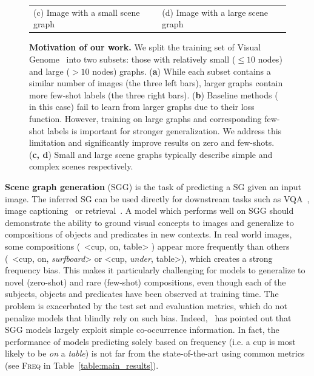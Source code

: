\begin{figure}
{\begin{minipage}{0.4\linewidth}
\begin{tabular}{p{3cm}p{3cm}}
				\centering (c) Image with a small scene graph & \centering (d) Image with a large scene graph
			\end{tabular}
		\end{minipage}
	}
	\vspace{-3pt}
	\caption{\small \textbf{Motivation of our work.} We split the training set of Visual Genome~\citep{Krishna_2017} into two subsets: those with relatively small ($\leq 10$ nodes) and large ($>10$ nodes) graphs. (\textbf{a}) While each subset contains a similar number of images (the three left bars), larger graphs contain more few-shot labels (the three right bars). (\textbf{b}) Baseline methods (\citep{xu2017scene} in this case) fail to learn from larger graphs due to their loss function. However, training on large graphs and corresponding few-shot labels is important for stronger generalization. We address this limitation and significantly improve results on zero and few-shots. (\textbf{c, d}) Small and large scene graphs typically describe simple and complex scenes respectively.  
	}
	\label{fig:motivation}
\end{figure}


\textbf{Scene graph generation} (SGG) is the task of predicting a SG given an input image. The inferred SG can be used directly for downstream tasks such as VQA~\citep{zhang2019empirical,NSM2019}, image captioning~\citep{yang2019auto, gu2019unpaired} or retrieval~\citep{johnson2015image,belilovsky2017joint,tang2020unbiased}.
A model which performs well on SGG should demonstrate the ability to ground visual concepts to images and generalize to compositions of objects and predicates in new contexts. In real world images, some compositions (\eg~<cup, on, table> ) appear more frequently than others (\eg~<cup, on, \textit{surfboard}> or <cup, \textit{under}, table>), which creates a strong frequency bias. This makes it particularly challenging for models to generalize to novel (zero-shot) and rare (few-shot) compositions, even though each of the subjects, objects and predicates have been observed at training time.
The problem is exacerbated by the test set and evaluation metrics, which do not penalize models that blindly rely on such bias. Indeed,~\citet{zellers2018neural} has pointed out that SGG models largely exploit simple co-occurrence information. In fact, the performance of models predicting solely based on frequency  (i.e. a cup is most likely to be \textit{on} a \textit{table}) is not far from the state-of-the-art using common metrics (see \textsc{Freq} in Table~\ref{table:main_results}).

